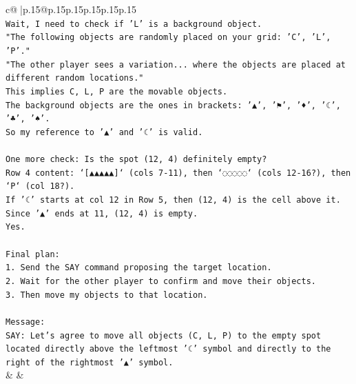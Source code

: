 \documentclass{article}
\begin{document}
{\begin{supertabular}{c@{$\;$}|p{.15\linewidth}@{}p{.15\linewidth}p{.15\linewidth}p{.15\linewidth}p{.15\linewidth}p{.15\linewidth}}
{{{\\ 
\texttt{Wait, I need to check if 'L' is a background object.} \\
\texttt{"The following objects are randomly placed on your grid: 'C', 'L', 'P'."} \\
\texttt{"The other player sees a variation... where the objects are placed at different random locations."} \\
\texttt{This implies C, L, P are the movable objects.} \\
\texttt{The background objects are the ones in brackets: '▲', '⚑', '♦', '☾', '♣', '♠'.} \\
\texttt{So my reference to '▲' and '☾' is valid.} \\
\\ 
\texttt{One more check: Is the spot (12, 4) definitely empty?} \\
\texttt{Row 4 content: `{[}▲▲▲▲▲{]}` (cols 7{-}11), then `◌◌◌◌◌` (cols 12{-}16?), then `P` (col 18?).} \\
\texttt{If '☾' starts at col 12 in Row 5, then (12, 4) is the cell above it.} \\
\texttt{Since '▲' ends at 11, (12, 4) is empty.} \\
\texttt{Yes.} \\
\\ 
\texttt{Final plan:} \\
\texttt{1. Send the SAY command proposing the target location.} \\
\texttt{2. Wait for the other player to confirm and move their objects.} \\
\texttt{3. Then move my objects to that location.} \\
\\ 
\texttt{Message:} \\
\texttt{SAY: Let's agree to move all objects (C, L, P) to the empty spot located directly above the leftmost '☾' symbol and directly to the right of the rightmost '▲' symbol.} \\
            }
        }
    }
    & & \\ \\


\end{supertabular}}
\end{document}
